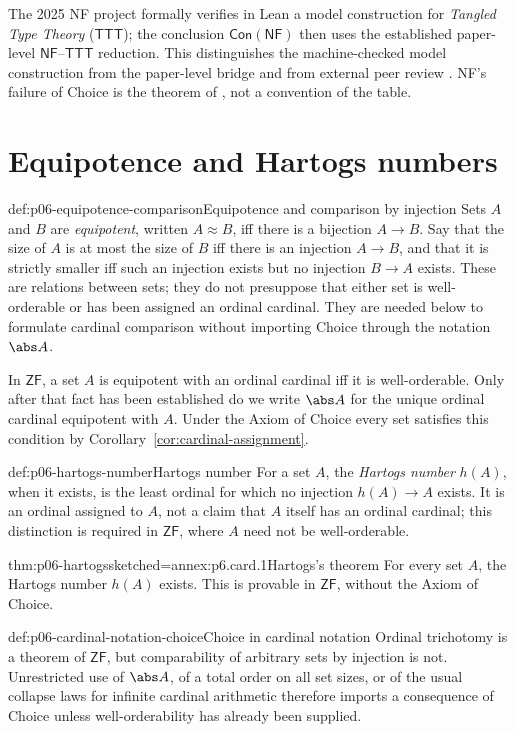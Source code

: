 The 2025 NF project formally verifies in Lean a model construction for
\emph{Tangled Type Theory} (\(\mathsf{TTT}\)); the conclusion
\(\mathsf{Con}(\mathsf{NF})\) then uses the established paper-level
\(\mathsf{NF}\)--\(\mathsf{TTT}\) reduction.  This distinguishes the
machine-checked model construction from the paper-level bridge and from
external peer review
\cite{Wilshaw2025ConNF}.  NF's failure of Choice is the theorem of
\cite{Specker1953}, not a convention of the table.

\section{Equipotence and Hartogs numbers}

\begin{hbdefinition}{def:p06-equipotence-comparison}{Equipotence and comparison by injection}
Sets \(A\) and \(B\) are \emph{equipotent}, written \(A\approx B\), iff
there is a bijection \(A\to B\).  Say that the size of \(A\) is at most the
size of \(B\) iff there is an injection \(A\to B\), and that it is strictly
smaller iff such an injection exists but no injection \(B\to A\) exists.
These are relations between sets; they do not presuppose that either set is
well-orderable or has been assigned an ordinal cardinal.  They are needed
below to formulate cardinal comparison without importing Choice through the
notation \(\abs A\).
\end{hbdefinition}

In \(\mathsf{ZF}\), a set \(A\) is equipotent with an ordinal cardinal iff it
is well-orderable.  Only after that fact has been established do we write
\(\abs A\) for the unique ordinal cardinal equipotent with \(A\).  Under the
Axiom of Choice every set satisfies this condition by
Corollary~\ref{cor:cardinal-assignment}.

\begin{hbdefinition}{def:p06-hartogs-number}{Hartogs number}
For a set \(A\), the \emph{Hartogs number} \(h(A)\), when it exists, is the
least ordinal for which no injection \(h(A)\to A\) exists.  It is an ordinal
assigned to \(A\), not a claim that \(A\) itself has an ordinal cardinal; this
distinction is required in \(\mathsf{ZF}\), where \(A\) need not be
well-orderable.
\end{hbdefinition}

\begin{hbtheorem}{thm:p06-hartogs}{sketched=annex:p6.card.1}{Hartogs's theorem}
For every set \(A\), the Hartogs number \(h(A)\) exists.  This is provable in
\(\mathsf{ZF}\), without the Axiom of Choice.
\end{hbtheorem}
\begin{hbwarning}{def:p06-cardinal-notation-choice}{Choice in cardinal notation}
Ordinal trichotomy is a theorem of \(\mathsf{ZF}\), but comparability of
arbitrary sets by injection is not.  Unrestricted use of \(\abs A\), of a
total order on all set sizes, or of the usual collapse laws for infinite
cardinal arithmetic therefore imports a consequence of Choice unless
well-orderability has already been supplied.
\end{hbwarning}

